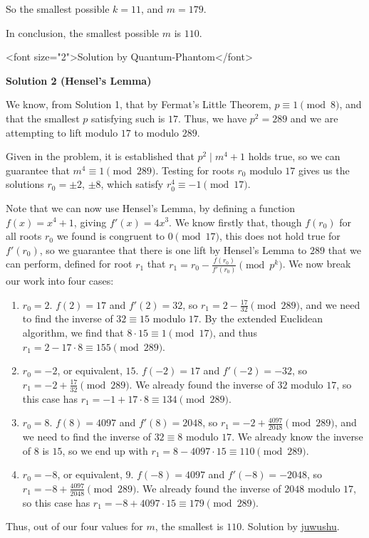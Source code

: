 \begin{enumerate}
 So the smallest possible \(k=11\), and \(m=179\).

 In conclusion, the smallest possible \(m\) is \(\boxed{110}\).

 <font size="2">Solution by Quantum-Phantom</font>




\textbf{Solution 2 (Hensel's Lemma)}

We know, from Solution 1, that by Fermat's Little Theorem, $p\equiv 1\pmod{8}$, and that the smallest $p$ satisfying such is $17$. Thus, we have $p^2=289$ and we are attempting to lift modulo $17$ to modulo $289$.

 Given in the problem, it is established that $p^2\mid m^4 +1$ holds true, so we can guarantee that $m^4\equiv 1\pmod{289}$. Testing for roots $r_0$ modulo $17$ gives us the solutions $r_0= \pm 2$, $\pm 8$, which satisfy $r_0^4\equiv -1 \pmod{17}$. 

 Note that we can now use Hensel's Lemma, by defining a function $f(x)=x^4+1$, giving $f'(x)=4x^3$. We know firstly that, though $f(r_0)$ for all roots $r_0$ we found is congruent to $0\pmod{17}$, this does not hold true for $f'(r_0)$, so we guarantee that there is one lift by Hensel's Lemma to $289$ that we can perform, defined for root $r_1$ that $r_1 = r_0-\frac{f(r_0)}{f'(r_0)}\pmod{p^k}$. We now break our work into four cases:

 
            \begin{enumerate}
        \item $r_0 = 2$. $f(2)=17$ and $f'(2)=32$, so $r_1=2-\frac{17}{32}\pmod{289}$, and we need to find the inverse of $32\equiv 15$ modulo $17$. By the extended Euclidean algorithm, we find that $8\cdot 15\equiv 1 \pmod{17}$, and thus $r_1=2-17\cdot 8\equiv 155 \pmod{289}$.
        \item $r_0 = -2$, or equivalent, $15$. $f(-2)=17$ and $f'(-2)=-32$, so $r_1=-2+\frac{17}{32}\pmod{289}$. We already found the inverse of $32$ modulo $17$, so this case has $r_1=-1+17\cdot 8\equiv 134 \pmod{289}$.
        \item $r_0 = 8$. $f(8)=4097$ and $f'(8)=2048$, so $r_1=-2+\frac{4097}{2048}\pmod{289}$, and we need to find the inverse of $32\equiv 8$ modulo $17$. We already know the inverse of $8$ is $15$, so we end up with $r_1=8-4097\cdot 15\equiv 110\pmod{289}$.
        \item $r_0 = -8$, or equivalent, $9$. $f(-8)=4097$ and $f'(-8)=-2048$, so $r_1=-8+\frac{4097}{2048}\pmod{289}$. We already found the inverse of $2048$ modulo $17$, so this case has $r_1=-8+4097\cdot 15\equiv 179\pmod{289}$.
            \end{enumerate}
            Thus, out of our four values for $m$, the smallest is $\boxed{110}$. Solution by \href{https://artofproblemsolving.com/wiki/index.php?title=User:Juwushu}{juwushu}.


\end{enumerate}
